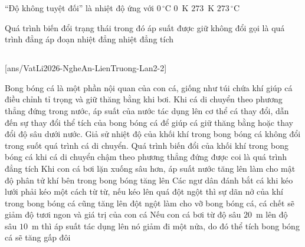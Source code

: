 	\begin{ex}%
		``Độ không tuyệt đối'' là nhiệt độ ứng với
		\choice
		{$0\,^\circ\text{C}$}
		{\True $0$~K}
		{$273$~K}
		{$273\,^\circ\text{C}$}
	\end{ex}

	\begin{ex}%
		Quá trình biến đổi trạng thái trong đó áp suất được giữ không đổi gọi là quá trình
		\choice
		{\True đẳng áp}
		{đoạn nhiệt}
		{đẳng nhiệt}
		{đẳng tích}
	\end{ex}

	\subsection*{}
	\setcounter{ex}{0}
	[ans/VatLi2026-NgheAn-LienTruong-Lan2-2]

	\begin{ex}%
		Bong bóng cá là một phần nội quan của con cá, giống như túi chứa khí giúp cá điều chỉnh tỉ trọng và giữ thăng bằng khi bơi. Khi cá di chuyển theo phương thẳng đứng trong nước, áp suất của nước tác dụng lên cơ thể cá thay đổi, dẫn đến sự thay đổi thể tích của bong bóng cá để giúp cá giữ thăng bằng hoặc thay đổi độ sâu dưới nước. Giả sử nhiệt độ của khối khí trong bong bóng cá không đổi trong suốt quá trình cá di chuyển.
		\choiceTFt
		{Quá trình biến đổi của khối khí trong bong bóng cá khi cá di chuyển chậm theo phương thẳng đứng được coi là quá trình đẳng tích}
		{\True Khi con cá bơi lặn xuống sâu hơn, áp suất nước tăng lên làm cho mật độ phân tử khí bên trong bong bóng tăng lên}
		{\True Các ngư dân đánh bắt cá khi kéo lưới phải kéo một cách từ từ, nếu kéo lên quá đột ngột thì sự dãn nở của khí trong bong bóng cá cũng tăng lên đột ngột làm cho vỡ bong bóng cá, cá chết sẽ giảm độ tươi ngon và giá trị của con cá}
		{Nếu con cá bơi từ độ sâu $20$~m lên độ sâu $10$~m thì áp suất tác dụng lên nó giảm đi một nửa, do đó thể tích bong bóng cá sẽ tăng gấp đôi}
	\end{ex}

